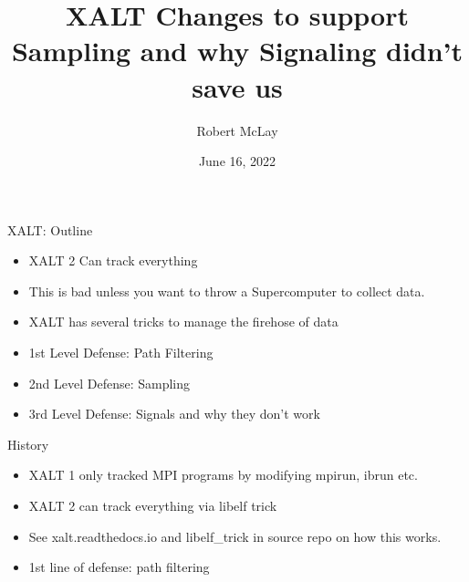 \documentclass{beamer}
\begin{document}
\title[XALT]{XALT Changes to support Sampling and why Signaling didn't
save us}
\author{Robert McLay}
\date{June 16, 2022}

\frame{\titlepage}

\begin{frame}{XALT: Outline}
  \begin{itemize}
    \item XALT 2 Can track everything 
    \item This is bad unless you want to throw a Supercomputer to
      collect data.
    \item XALT has several tricks to manage the firehose of data
    \item 1st Level Defense: Path Filtering
    \item 2nd Level Defense: Sampling
    \item 3rd Level Defense: Signals and why they don't work
  \end{itemize}
\end{frame}

\begin{frame}{History}
  \begin{itemize}
    \item XALT 1 only tracked MPI programs by modifying mpirun, ibrun etc.
    \item XALT 2 can track everything via libelf trick
    \item See xalt.readthedocs.io and libelf\_trick in source repo on
      how this works.
    \item 1st line of defense: path filtering
  \end{itemize}
\end{frame}
\end{document}
